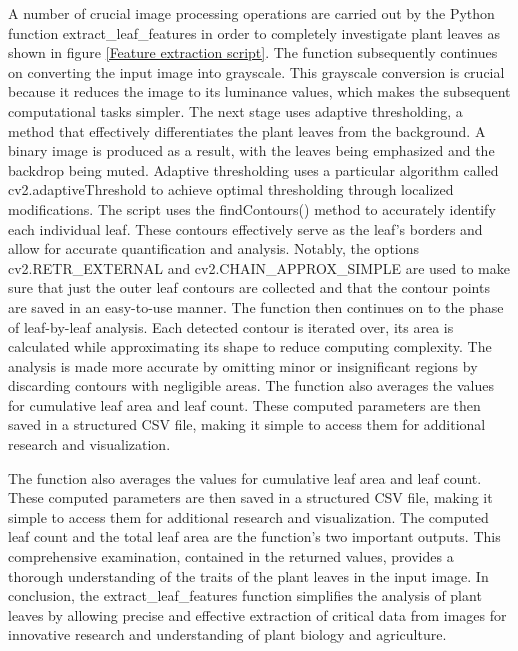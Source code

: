 \documentclass[a4paper,12pt]{report}%
\renewcommand{\\}{\vspace*{0.5\baselineskip} \newline}
\begin{document}
\noindent A number of crucial image processing operations are carried out by the Python function extract\_leaf\_features in order to completely investigate plant leaves as shown in figure \ref{Feature extraction script}. The function subsequently continues on converting the input image into grayscale. This grayscale conversion is crucial because it reduces the image to its luminance values, which makes the subsequent computational tasks simpler.
The next stage uses adaptive thresholding, a method that effectively differentiates the plant leaves from the background. A binary image is produced as a result, with the leaves being emphasized and the backdrop being muted. Adaptive thresholding uses a particular algorithm called cv2.adaptiveThreshold to achieve optimal thresholding through localized modifications.
The script uses the findContours() method to accurately identify each individual leaf. These contours effectively serve as the leaf's borders and allow for accurate quantification and analysis. Notably, the options cv2.RETR\_EXTERNAL and cv2.CHAIN\_APPROX\_SIMPLE are used to make sure that just the outer leaf contours are collected and that the contour points are saved in an easy-to-use manner.
The function then continues on to the phase of leaf-by-leaf analysis. Each detected contour is iterated over, its area is calculated while approximating its shape to reduce computing complexity. The analysis is made more accurate by omitting minor or insignificant regions by discarding contours with negligible areas.
The function also averages the values for cumulative leaf area and leaf count. These computed parameters are then saved in a structured CSV file, making it simple to access them for additional research and visualization.

\noindent The function also averages the values for cumulative leaf area and leaf count. These computed parameters are then saved in a structured CSV file, making it simple to access them for additional research and visualization.
The computed leaf count and the total leaf area are the function's two important outputs. This comprehensive examination, contained in the returned values, provides a thorough understanding of the traits of the plant leaves in the input image. In conclusion, the extract\_leaf\_features function simplifies the analysis of plant leaves by allowing precise and effective extraction of critical data from images for innovative research and understanding of plant biology and agriculture.
\end{document}

